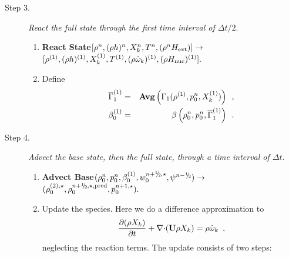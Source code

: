 \documentclass[11pt]{article}
\newcommand{\rhozero}{\rho_0}
\newcommand{\gammabar}{\overline{\Gamma}_1}
\newcommand{\nablab}{\mathbf{\nabla}}
\newcommand{\cdotb}{\mathbf{\cdot}}
\newcommand{\sfrac}[2]{\mathchoice
  {\kern0em\raise.5ex\hbox{\the\scriptfont0 #1}\kern-.15em/
   \kern-.15em\lower.25ex\hbox{\the\scriptfont0 #2}}
  {\kern0em\raise.5ex\hbox{\the\scriptfont0 #1}\kern-.15em/
   \kern-.15em\lower.25ex\hbox{\the\scriptfont0 #2}}
  {\kern0em\raise.5ex\hbox{\the\scriptscriptfont0 #1}\kern-.2em/
   \kern-.15em\lower.25ex\hbox{\the\scriptscriptfont0 #2}}
  {#1\!/#2}}
\newcommand{\myhalf}{\sfrac{1}{2}}
\newcommand{\nph}{{n + \myhalf}}
\newcommand{\nmh}{{n - \myhalf}}
\newcommand{\Hext}{{H_{\rm ext}}}
\newcommand{\Hnuc}{{H_{\rm nuc}}}
\newcommand{\dt}{\Delta t}
\newcommand{\ubold}{\mathbf{U}}
\newcommand{\omegadot}{\dot{\omega}}
\begin{document}
\begin{description}
\item[Step 3.] {\em React the full state through the first time interval of $\dt / 2.$}

\begin{enumerate}
\renewcommand{\theenumi}{{\bf \alph{enumi}}}

\item {\bf React State}$[\rho^n, (\rho h)^n, X_k^n, T^n, (\rho^n \Hext)]
                   \rightarrow$ $[ \rho^{(1)}, (\rho h)^{(1)}, X_k^{(1)}, T^{(1)},
                                  (\rho \omegadot_k)^{(1)}, (\rho \Hnuc)^{(1)} ].$  

\item
Define
\begin{eqnarray}
\gammabar^{(1)}        &=& {\rm{\bf Avg}} \left( \Gamma_1(\rho^{(1)}, p_0^{n}, X_k^{(1)}) \right) \enskip , \\
 {\beta   }_0^{(1)}    &=& \beta   \left(\rho_0^{n}, p_0^{n}, \gammabar^{(1)}\right) \enskip .
\end{eqnarray}

\end{enumerate}

\item[Step 4.] {\em Advect the base state, then the full state, through a time interval of $\dt.$}

\begin{enumerate}
\renewcommand{\theenumi}{{\bf \alph{enumi}}}

\item {\bf Advect Base}$(\rhozero^{n}, p_0^{n}, \beta_0^{(1)}, w_0^{\nph,\star}, \psi^{\nmh}) \rightarrow $
$(\rho_0^{(2),\star}, \rho_0^{\nph,\star,{\rm pred}}, p_0^{n+1,\star}).$ 

\item Update the species.  Here we do a difference approximation
  to 
  \begin{equation}
  \frac{\partial (\rho X_k)}{\partial t} + \nablab \cdotb (\ubold \rho X_k) =
         \rho {\omegadot}_k \enskip , \label{eq:species}
  \end{equation}
  neglecting the reaction terms.  The update consists of two steps:

  \begin{enumerate}
  \renewcommand{\labelenumii}{{\bf \roman{enumii}}.}


\end{enumerate}
\end{enumerate}
\end{description}
\end{document}
